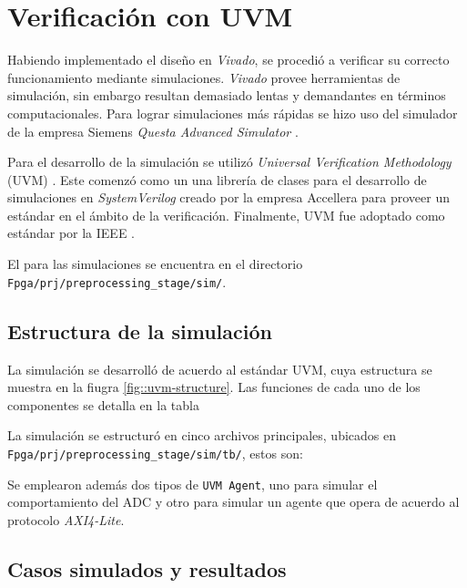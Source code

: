 \documentclass[../../main.tex]{subfiles}
\begin{document}


\section{Verificación con UVM}
Habiendo implementado el diseño en \textit{Vivado}, se procedió a verificar su correcto funcionamiento mediante simulaciones. \textit{Vivado} provee herramientas de simulación, sin embargo resultan demasiado lentas y demandantes en términos computacionales. Para lograr simulaciones más rápidas se hizo uso del simulador de la empresa Siemens \textit{Questa Advanced Simulator} \cite{questa}. 

Para el desarrollo de la simulación se utilizó \textit{Universal Verification Methodology} (UVM) \cite{uvm}. Este comenzó como un una librería de clases para el desarrollo de simulaciones en \textit{SystemVerilog} creado por la empresa Accellera para proveer un estándar en el ámbito de la verificación. Finalmente, UVM fue adoptado como estándar por la IEEE \cite{uvm-ieee}.

El para las simulaciones se encuentra en el directorio \texttt{Fpga/prj/preprocessing\_stage/sim/}.

\subsection{Estructura de la simulación}
La simulación se desarrolló de acuerdo al estándar UVM, cuya estructura se muestra en la fiugra \ref{fig::uvm-structure}. Las funciones de cada uno de los componentes se detalla en la tabla 


La simulación se estructuró en cinco archivos principales, ubicados en \texttt{Fpga/prj/preprocessing\_stage/sim/tb/}, estos son:


Se emplearon además dos tipos de \texttt{UVM Agent}, uno para simular el comportamiento del ADC y otro para simular un agente que opera de acuerdo al protocolo \textit{AXI4-Lite}\cite{AXI-4}. 


\subsection{Casos simulados y resultados}
\end{document}
